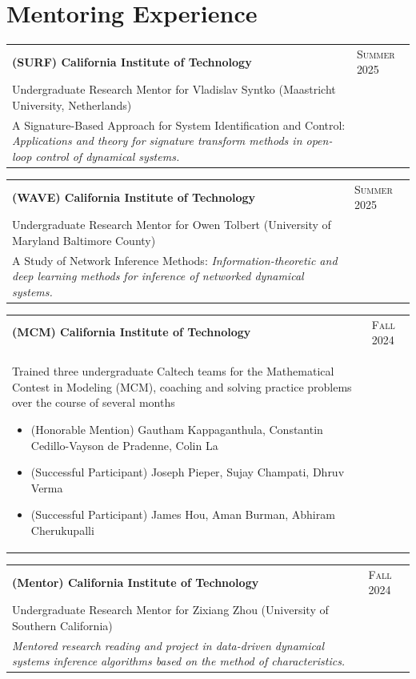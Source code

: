 \documentclass[a4paper,10pt]{article}
\begin{document}
\section*{Mentoring Experience}
\begin{tabularx}{\textwidth}{@{}X|>{\raggedleft\arraybackslash}p{2.2cm}@{}}
\textbf{(SURF) California Institute of Technology} & \textsc{Summer} 2025\\[2pt]
Undergraduate Research Mentor for Vladislav Syntko (Maastricht University, Netherlands)\\
A Signature-Based Approach for System Identification and Control: \textit{Applications and theory for signature transform methods in open-loop control of dynamical systems.}
\end{tabularx}
\vspace{10pt}

\begin{tabularx}{\textwidth}{@{}X|>{\raggedleft\arraybackslash}p{2.2cm}@{}}
\textbf{(WAVE) California Institute of Technology} & \textsc{Summer} 2025\\[2pt]
Undergraduate Research Mentor for Owen Tolbert (University of Maryland Baltimore County)\\
A Study of Network Inference Methods: \textit{Information-theoretic and deep learning methods for inference of networked dynamical systems.}
\end{tabularx}
\vspace{10pt}

\begin{tabularx}{\textwidth}{@{}X|>{\raggedleft\arraybackslash}p{2.2cm}@{}}
\textbf{(MCM) California Institute of Technology} & \textsc{Fall} 2024\\[2pt]
Trained three undergraduate Caltech teams for the Mathematical Contest in Modeling (MCM), coaching and solving practice problems over the course of several months
\begin{itemize}
  \item (Honorable Mention) Gautham Kappaganthula, Constantin Cedillo-Vayson de Pradenne, Colin La
  \item (Successful Participant) Joseph Pieper, Sujay Champati, Dhruv Verma
  \item (Successful Participant) James Hou, Aman Burman, Abhiram Cherukupalli
\end{itemize}
\end{tabularx}
\vspace{10pt}

\begin{tabularx}{\textwidth}{@{}X|>{\raggedleft\arraybackslash}p{2.2cm}@{}}
\textbf{(Mentor) California Institute of Technology} & \textsc{Fall} 2024\\[2pt]
Undergraduate Research Mentor for Zixiang Zhou (University of Southern California)\\
\textit{Mentored research reading and project in data-driven dynamical systems inference algorithms based on the method of characteristics.}
\end{tabularx}
\vspace{10pt}
\end{document}
